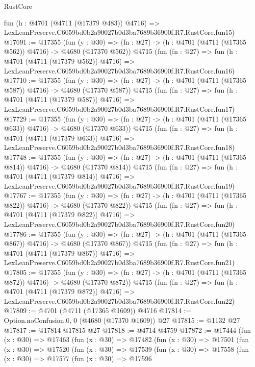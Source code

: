 \begin{lexlean}{RustCore}
\begin{coremodule}
    fun (h : @4701 (@4711 (@17379 @483)) @4716) =>
    LexLeanPreserve.C6059bd0b2a90027b0d3ba7689b36900f.R7.RustCore.fun15)
@17691 := @17355
    (fun (y : @30) => (fn : @27) -> (h : @4701 (@4711 (@17365 @562)) @4716) -> @4680 (@17370 @562))
    @4715
    (fun (fn : @27) =>
    fun (h : @4701 (@4711 (@17379 @562)) @4716) =>
    LexLeanPreserve.C6059bd0b2a90027b0d3ba7689b36900f.R7.RustCore.fun16)
@17710 := @17355
    (fun (y : @30) => (fn : @27) -> (h : @4701 (@4711 (@17365 @587)) @4716) -> @4680 (@17370 @587))
    @4715
    (fun (fn : @27) =>
    fun (h : @4701 (@4711 (@17379 @587)) @4716) =>
    LexLeanPreserve.C6059bd0b2a90027b0d3ba7689b36900f.R7.RustCore.fun17)
@17729 := @17355
    (fun (y : @30) => (fn : @27) -> (h : @4701 (@4711 (@17365 @633)) @4716) -> @4680 (@17370 @633))
    @4715
    (fun (fn : @27) =>
    fun (h : @4701 (@4711 (@17379 @633)) @4716) =>
    LexLeanPreserve.C6059bd0b2a90027b0d3ba7689b36900f.R7.RustCore.fun18)
@17748 := @17355
    (fun (y : @30) => (fn : @27) -> (h : @4701 (@4711 (@17365 @814)) @4716) -> @4680 (@17370 @814))
    @4715
    (fun (fn : @27) =>
    fun (h : @4701 (@4711 (@17379 @814)) @4716) =>
    LexLeanPreserve.C6059bd0b2a90027b0d3ba7689b36900f.R7.RustCore.fun19)
@17767 := @17355
    (fun (y : @30) => (fn : @27) -> (h : @4701 (@4711 (@17365 @822)) @4716) -> @4680 (@17370 @822))
    @4715
    (fun (fn : @27) =>
    fun (h : @4701 (@4711 (@17379 @822)) @4716) =>
    LexLeanPreserve.C6059bd0b2a90027b0d3ba7689b36900f.R7.RustCore.fun20)
@17786 := @17355
    (fun (y : @30) => (fn : @27) -> (h : @4701 (@4711 (@17365 @867)) @4716) -> @4680 (@17370 @867))
    @4715
    (fun (fn : @27) =>
    fun (h : @4701 (@4711 (@17379 @867)) @4716) =>
    LexLeanPreserve.C6059bd0b2a90027b0d3ba7689b36900f.R7.RustCore.fun21)
@17805 := @17355
    (fun (y : @30) => (fn : @27) -> (h : @4701 (@4711 (@17365 @872)) @4716) -> @4680 (@17370 @872))
    @4715
    (fun (fn : @27) =>
    fun (h : @4701 (@4711 (@17379 @872)) @4716) =>
    LexLeanPreserve.C6059bd0b2a90027b0d3ba7689b36900f.R7.RustCore.fun22)
@17809 := @4701 (@4711 (@17365 @1609)) @4716
@17814 := Option.noConfusion.{0, 0} (@4680 (@17370 @1609)) @27
@17815 := @1132 @27
@17817 := @17814 @17815 @27
@17818 := @4714 @4759
@17872 := @17444
    (fun (x : @30) =>
    @17463
      (fun (x : @30) =>
      @17482
        (fun (x : @30) =>
        @17501
          (fun (x : @30) =>
          @17520
            (fun (x : @30) =>
            @17539
              (fun (x : @30) =>
              @17558
                (fun (x : @30) =>
                @17577
                  (fun (x : @30) =>
                  @17596

\end{coremodule}
\end{lexlean}

